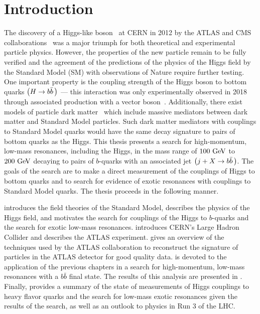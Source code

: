 \chapter{Introduction}\label{chapter:introduction}

The discovery of a Higgs-like boson~\cite{Higgs:1964ia,Higgs:1964pj,Higgs:1966ev,Englert:1964et,Guralnik:1964eu} at CERN in 2012 by the \Gls{ATLAS} and CMS collaborations~\cite{HIGG-2012-27,Chatrchyan:2012xdj} was a major triumph for both theoretical and experimental particle physics.
However, the properties of the new particle remain to be fully verified and the agreement of the predictions of the physics of the Higgs field by the \Gls{Standard Model} (SM) with observations of Nature require further testing.
One important property is the coupling strength of the Higgs boson to bottom quarks $\left(H \to b\bar{b}\,\right)$ --- this interaction was only experimentally observed in 2018 through associated production with a vector boson~\cite{HIGG-2018-04,CMS:2018abb}.
Additionally, there exist models of particle dark matter~\cite{Abdallah:2015ter} which include massive mediators between dark matter and Standard Model particles.
Such \glspl{dark matter mediator} with couplings to Standard Model quarks would have the same decay signature to pairs of bottom quarks as the Higgs.
This thesis presents a search for high-momentum, low-mass resonances, including the Higgs, in the mass range of $100~\mathrm{GeV}$ to $200~\mathrm{GeV}$ decaying to pairs of $b$-quarks with an associated jet $\left(j + X \to b\bar{b}\,\right)$.
The goals of the search are to make a direct measurement of the couplings of Higgs to bottom quarks and to search for evidence of exotic resonances with couplings to Standard Model quarks.
The thesis proceeds in the following manner.

 introduces the field theories of the Standard Model, describes the physics of the Higgs field, and motivates the search for couplings of the Higgs to $b$-quarks and the search for exotic low-mass resonances.
 introduces CERN's Large Hadron Collider and  describes the ATLAS experiment.
 gives an overview of the techniques used by the ATLAS collaboration to reconstruct the signature of particles in the ATLAS detector for good quality data.
 is devoted to the application of the previous chapters in a search for high-momentum, low-mass resonances with a $b\bar{b}$ final state.
The results of this analysis are presented in .
Finally,  provides a summary of the state of measurements of Higgs couplings to heavy flavor quarks and the search for low-mass exotic resonances given the results of the search, as well as an outlook to physics in Run 3 of the LHC.

